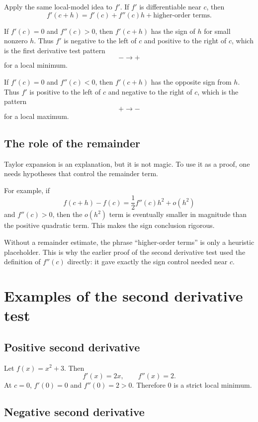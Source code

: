 \documentclass{essay}
\begin{document}
Apply the same local-model idea to \(f'\). If \(f'\) is differentiable near \(c\), then
\[ f'(c+h) = f'(c) + f''(c)h + \text{higher-order terms}. \]

If \(f'(c)=0\) and \(f''(c)>0\), then \(f'(c+h)\) has the sign of \(h\) for small nonzero \(h\). Thus \(f'\) is negative to the left of \(c\) and positive to the right of \(c\), which is the first derivative test pattern
\[ -\longrightarrow + \]
for a local minimum.

If \(f'(c)=0\) and \(f''(c)<0\), then \(f'(c+h)\) has the opposite sign from \(h\). Thus \(f'\) is positive to the left of \(c\) and negative to the right of \(c\), which is the pattern
\[ +\longrightarrow - \]
for a local maximum.

\subsection{The role of the remainder}

Taylor expansion is an explanation, but it is not magic. To use it as a proof, one needs hypotheses that control the remainder term.

For example, if
\[ f(c+h)-f(c) = \frac{1}{2} f''(c)h^{2} + o(h^{2}) \]
and \(f''(c)>0\), then the \(o(h^{2})\) term is eventually smaller in magnitude than the positive quadratic term. This makes the sign conclusion rigorous.

Without a remainder estimate, the phrase ``higher-order terms'' is only a heuristic placeholder. This is why the earlier proof of the second derivative test used the definition of \(f''(c)\) directly: it gave exactly the sign control needed near \(c\).

\section{Examples of the second derivative test}

\subsection{Positive second derivative}

Let \(f(x)=x^{2}+3\).
Then
\[ f'(x)=2x, \qquad f''(x)=2. \]
At \(c=0\), \(f'(0)=0\) and \(f''(0)=2>0\).
Therefore \(0\) is a strict local minimum.

\subsection{Negative second derivative}
\end{document}
